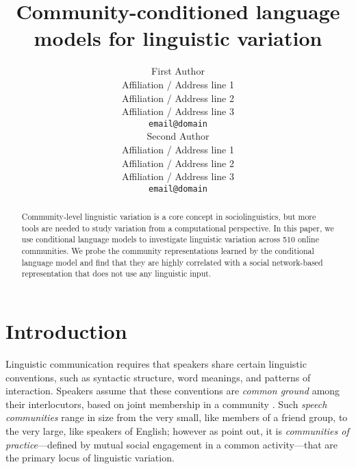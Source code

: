 \documentclass[11pt]{article}
\title{Community-conditioned language models for linguistic variation}
\author{First Author \\
  Affiliation / Address line 1 \\
  Affiliation / Address line 2 \\
  Affiliation / Address line 3 \\
  \texttt{email@domain} \\\And
  Second Author \\
  Affiliation / Address line 1 \\
  Affiliation / Address line 2 \\
  Affiliation / Address line 3 \\
  \texttt{email@domain} \\}
\date{}
\begin{document}
\maketitle
\begin{abstract}
  Community-level linguistic variation is a core concept in sociolinguistics,
  but more tools are needed to study variation from a computational perspective.
  In this paper, we use conditional language models to investigate linguistic variation
  across 510 online communities.
  We probe the community representations learned by the conditional language model
  and find that they are highly correlated with a social network-based 
  representation that does not use any linguistic input.
\end{abstract}








\section{Introduction}

Linguistic communication requires that speakers share
certain linguistic conventions, such as syntactic
structure, word meanings, and patterns of interaction.
Speakers assume that these conventions are \emph{common ground} among
their interlocutors, based on joint membership in a community
\cite{Stalnaker2002, Clark1996}.  Such \emph{speech communities} \citep{Gumperz1972} 
range in size from the very small, like members of a friend group, 
to the very large, like speakers of English; however as \citet{Eckert1992}
point out, it is \emph{communities of practice}---defined by mutual social engagement
in a common activity---that are the primary locus of linguistic variation.
\end{document}
